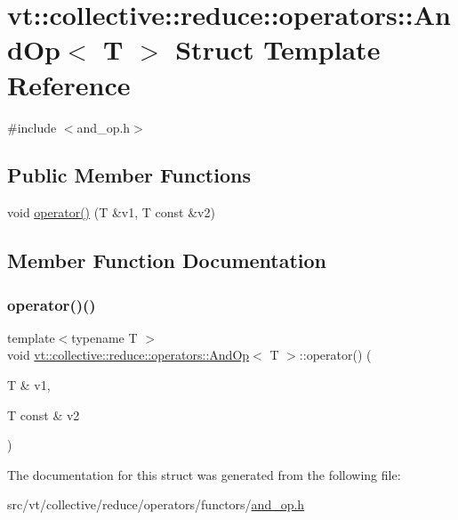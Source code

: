 \hypertarget{structvt_1_1collective_1_1reduce_1_1operators_1_1_and_op}{}\section{vt\+:\+:collective\+:\+:reduce\+:\+:operators\+:\+:And\+Op$<$ T $>$ Struct Template Reference}
\label{structvt_1_1collective_1_1reduce_1_1operators_1_1_and_op}


{\ttfamily \#include $<$and\+\_\+op.\+h$>$}

\subsection*{Public Member Functions}
\begin{DoxyCompactItemize}
\item 
void \hyperlink{structvt_1_1collective_1_1reduce_1_1operators_1_1_and_op_a64d3c08099a721a7357f3e1e54016ed7}{operator()} (T \&v1, T const \&v2)
\end{DoxyCompactItemize}


\subsection{Member Function Documentation}
\mbox{\label{structvt_1_1collective_1_1reduce_1_1operators_1_1_and_op_a64d3c08099a721a7357f3e1e54016ed7}} 
\subsubsection{\texorpdfstring{operator()()}{operator()()}}
{\footnotesize\ttfamily template$<$typename T $>$ \\
void \hyperlink{structvt_1_1collective_1_1reduce_1_1operators_1_1_and_op}{vt\+::collective\+::reduce\+::operators\+::\+And\+Op}$<$ T $>$\+::operator() (\begin{DoxyParamCaption}\item[{T \&}]{v1,  }\item[{T const \&}]{v2 }\end{DoxyParamCaption})\hspace{0.3cm}{\ttfamily [inline]}}



The documentation for this struct was generated from the following file\+:\begin{DoxyCompactItemize}
\item 
src/vt/collective/reduce/operators/functors/\hyperlink{and__op_8h}{and\+\_\+op.\+h}\end{DoxyCompactItemize}
